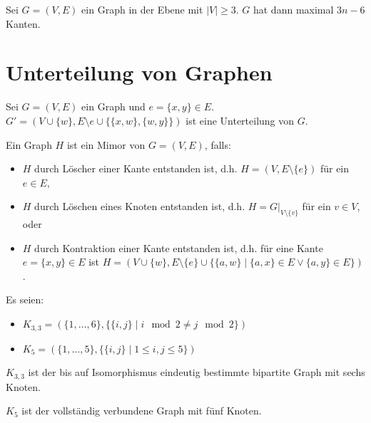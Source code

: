 \begin{corollary}
    Sei $ G = (V, E) $ ein Graph in der Ebene mit $ |V| \geq 3 $.
    $ G $ hat dann maximal $ 3n - 6 $ Kanten.
\end{corollary}

\section{Unterteilung von Graphen}

\begin{definition}[Unterteilung]
    Sei $ G = (V, E) $ ein Graph und $ e = \{ x, y \} \in E $.
    $ G' = (V \cup \{ w \}, E \setminus e \cup \{ \{ x, w \}, \{ w, y \} \}) $ ist eine Unterteilung von $ G $.
\end{definition}

\begin{definition}
    Ein Graph $ H $ ist ein Mimor von $ G = (V, E) $, falls:
    \begin{itemize}
        \item $ H $ durch Löscher einer Kante entstanden ist, d.h. $ H = (V, E \setminus \{ e \}) $ für ein $ e \in E $,
        \item $ H $ durch Löschen eines Knoten entstanden ist, d.h. $ H = G|_{V \setminus \{ v \}} $ für ein $ v \in V $, oder
        \item $ H $ durch Kontraktion einer Kante entstanden ist, d.h. für eine Kante $ e = \{ x, y \} \in E $ ist $ H = (V \cup \{ w \}, E \setminus \{ e \} \cup \{ \{ a, w \} \mid \{ a, x \} \in E \lor \{ a, y \} \in E \}) $.
    \end{itemize}
\end{definition}

\begin{definition}
    Es seien:
    \begin{itemize}
        \item $ K_{3,3} = (\{ 1, \dots, 6 \}, \{ \{ i, j \} \mid i \mod 2 \ne j \mod 2 \})$
        \item $ K_5 = (\{ 1, \dots, 5 \}, \{ \{ i, j \} \mid 1 \leq i, j \leq 5 \}) $
    \end{itemize}
\end{definition}

\begin{remark}
    $ K_{3,3} $ ist der bis auf Isomorphismus eindeutig bestimmte bipartite Graph mit sechs Knoten.

    $ K_5 $ ist der vollständig verbundene Graph mit fünf Knoten.
\end{remark}

